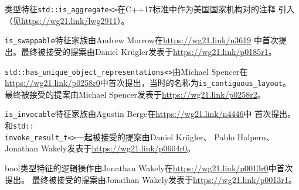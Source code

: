 类型特征\texttt{std::is\_aggregate<>}在C++17标准中作为美国国家机构对的注释
引入（见\url{https://wg21.link/lwg2911}）。

\texttt{is\_swappable}特征家族由Andrew Morrow在\url{https://wg21.link/n3619}
中首次提出。最终被接受的提案由Daniel Krügler发表于\url{https://wg21.link/p0185r1}。

\texttt{std::has\_unique\_object\_representations<>}由Michael Spencer在\\
\url{https://wg21.link/p0258r0}中首次提出，当时的名称为\texttt{is\_contiguous\_layout}。
最终被接受的提案由Michael Spencer发表于\url{https://wg21.link/p0258r2}。

\texttt{is\_invocable}特征家族由Agustin Berge在\url{https://wg21.link/n4446}中
首次提出。和\texttt{std::\\
invoke\_result\_t<>}一起被接受的提案由Daniel Krügler、
Pablo Halpern、Jonathan Wakely发表于\url{https://wg21.link/p0604r0}。

bool类型特征的逻辑操作由Jonathan Wakely在\url{https://wg21.link/p0013r0}中首次提出。
最终被接受的提案由Jonathan Wakely发表于\url{https://wg21.link/p0013r1}。